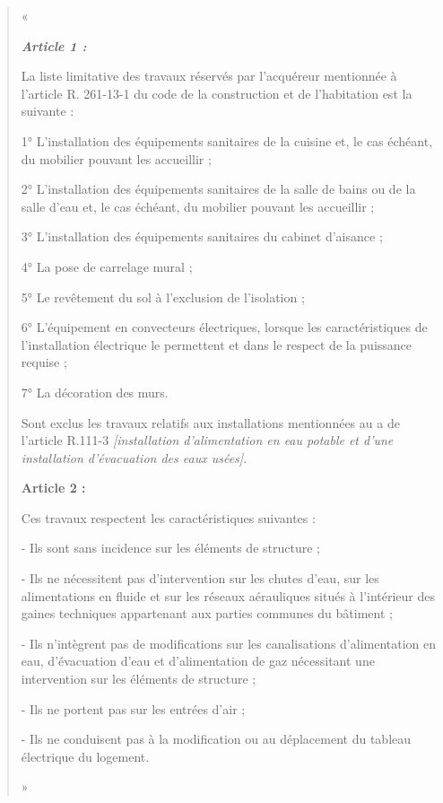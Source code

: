 \begin{enumerate}
\begin{itemize}
\begin{quote}
								« {\itshape \textbf{Article 1 :}

								\medskip La liste limitative des travaux réservés par l'acquéreur mentionnée à l'article R. 261-13-1 du code de la construction et de l'habitation est la suivante :

								1° L'installation des équipements sanitaires de la cuisine et, le cas échéant, du mobilier pouvant les accueillir ;

								2° L'installation des équipements sanitaires de la salle de bains ou de la salle d'eau et, le cas échéant, du mobilier pouvant les accueillir ;

								3° L'installation des équipements sanitaires du cabinet d'aisance ;

								4° La pose de carrelage mural ;

								5° Le revêtement du sol à l'exclusion de l'isolation ;

								6° L'équipement en convecteurs électriques, lorsque les caractéristiques de l'installation électrique le permettent et dans le respect de la puissance requise ;

								7° La décoration des murs.

								\medskip Sont exclus les travaux relatifs aux installations mentionnées au a de l'article R.111-3 \emph{[installation d'alimentation en eau potable et d'une installation d'évacuation des eaux usées]}.

								\bigskip \textbf{Article 2 :}

								\medskip Ces travaux respectent les caractéristiques suivantes :

								-	Ils sont sans incidence sur les éléments de structure ;

								-	Ils ne nécessitent pas d'intervention sur les chutes d'eau, sur les alimentations en fluide et sur les réseaux aérauliques situés à l'intérieur des gaines techniques appartenant aux parties communes du bâtiment ;

								-	Ils n'intègrent pas de modifications sur les canalisations d'alimentation en eau, d'évacuation d'eau et d'alimentation de gaz nécessitant une intervention sur les éléments de structure ;

								-	Ils ne portent pas sur les entrées d'air ;

								-	Ils ne conduisent pas à la modification ou au déplacement du tableau électrique du logement.} »

								\end{quote}
						\end{itemize}



\end{enumerate}
